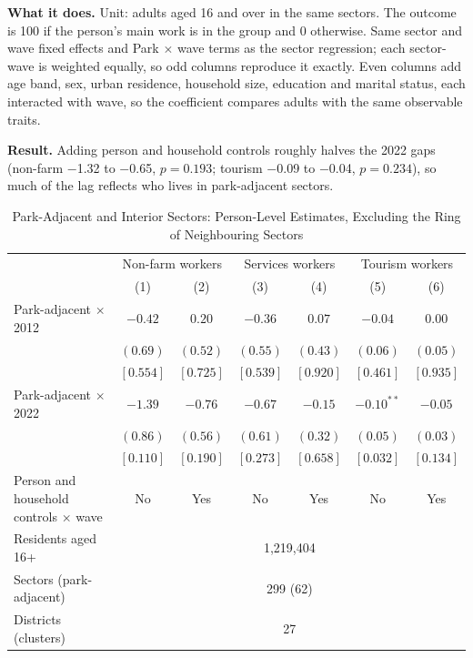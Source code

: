 \documentclass[11pt]{article}
\begin{document}
\textbf{What it does.} Unit: adults aged 16 and over in the same sectors. The outcome is 100 if the person's main work is in the group and 0 otherwise. Same sector and wave fixed effects and Park $\times$ wave terms as the sector regression; each sector-wave is weighted equally, so odd columns reproduce it exactly. Even columns add age band, sex, urban residence, household size, education and marital status, each interacted with wave, so the coefficient compares adults with the same observable traits.

\textbf{Result.} Adding person and household controls roughly halves the 2022 gaps (non-farm $-$1.32 to $-$0.65, $p=0.193$; tourism $-$0.09 to $-$0.04, $p=0.234$), so much of the lag reflects who lives in park-adjacent sectors.
\clearpage
\begin{table}[H]
\centering
\caption{Park-Adjacent and Interior Sectors: Person-Level Estimates, Excluding the Ring of Neighbouring Sectors}
\label{tab:census_park_gap_person-no-ring}
\begin{tabular}{lcccccc}
\toprule
 & \multicolumn{2}{c}{Non-farm workers} & \multicolumn{2}{c}{Services workers} & \multicolumn{2}{c}{Tourism workers} \\
 & (1) & (2) & (3) & (4) & (5) & (6) \\
\midrule
Park-adjacent $\times$ 2012 & $-0.42$ & $0.20$ & $-0.36$ & $0.07$ & $-0.04$ & $0.00$ \\
 & $(0.69)$ & $(0.52)$ & $(0.55)$ & $(0.43)$ & $(0.06)$ & $(0.05)$ \\
 & $[0.554]$ & $[0.725]$ & $[0.539]$ & $[0.920]$ & $[0.461]$ & $[0.935]$ \\
Park-adjacent $\times$ 2022 & $-1.39$ & $-0.76$ & $-0.67$ & $-0.15$ & $-0.10^{**}$ & $-0.05$ \\
 & $(0.86)$ & $(0.56)$ & $(0.61)$ & $(0.32)$ & $(0.05)$ & $(0.03)$ \\
 & $[0.110]$ & $[0.190]$ & $[0.273]$ & $[0.658]$ & $[0.032]$ & $[0.134]$ \\
\midrule
Person and household controls $\times$ wave & No & Yes & No & Yes & No & Yes \\
Residents aged 16+ & \multicolumn{6}{c}{1,219,404} \\
Sectors (park-adjacent) & \multicolumn{6}{c}{299 (62)} \\
Districts (clusters) & \multicolumn{6}{c}{27} \\
\bottomrule
\end{tabular}
\begin{minipage}{0.95\textwidth}\footnotesize

\end{minipage}
\end{table}
\end{document}
